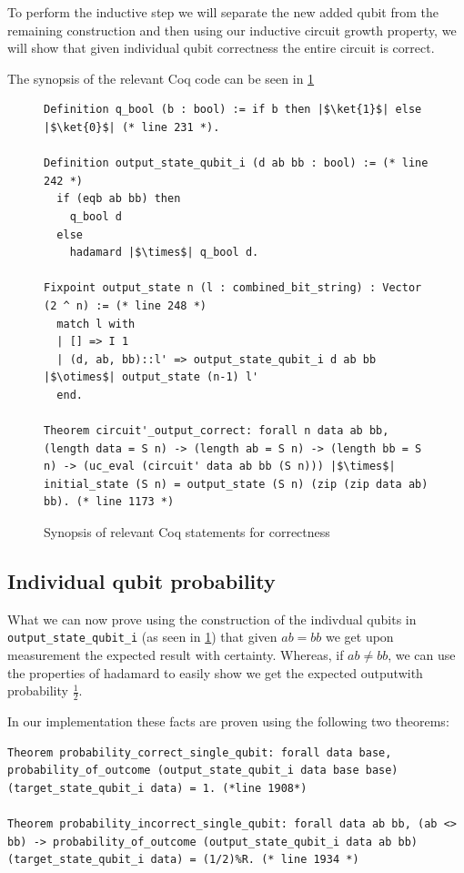 \documentclass{article}
\begin{document}
To perform the inductive step we will separate the new added qubit from the remaining construction and then using our inductive circuit growth property, we will show that given individual qubit correctness the entire circuit is correct.

The synopsis of the relevant Coq code can be seen in \cref{fig:correct-main-circuit}
\begin{figure}[h]
    \centering
\begin{verbatim}
Definition q_bool (b : bool) := if b then |$\ket{1}$| else |$\ket{0}$| (* line 231 *).

Definition output_state_qubit_i (d ab bb : bool) := (* line 242 *)
  if (eqb ab bb) then
    q_bool d
  else
    hadamard |$\times$| q_bool d.

Fixpoint output_state n (l : combined_bit_string) : Vector (2 ^ n) := (* line 248 *)
  match l with
  | [] => I 1
  | (d, ab, bb)::l' => output_state_qubit_i d ab bb |$\otimes$| output_state (n-1) l'
  end.
  
Theorem circuit'_output_correct: forall n data ab bb, (length data = S n) -> (length ab = S n) -> (length bb = S n) -> (uc_eval (circuit' data ab bb (S n))) |$\times$| initial_state (S n) = output_state (S n) (zip (zip data ab) bb). (* line 1173 *)
\end{verbatim}
    \caption{Synopsis of relevant Coq statements for correctness}
    \label{fig:correct-main-circuit}
\end{figure}

\subsection{Individual qubit probability}\label{sec:qubit-prob}

What we can now prove using the construction of the indivdual qubits in \texttt{output\_state\_qubit\_i} (as seen in \cref{fig:correct-main-circuit}) that given $ab=bb$ we get upon measurement the expected result with certainty.
Whereas, if $ab\neq bb$, we can use the properties of hadamard to easily show we get the expected outputwith probability $\frac{1}{2}$.

In our implementation these facts are proven using the following two theorems:
\begin{verbatim}
Theorem probability_correct_single_qubit: forall data base, probability_of_outcome (output_state_qubit_i data base base) (target_state_qubit_i data) = 1. (*line 1908*)

Theorem probability_incorrect_single_qubit: forall data ab bb, (ab <> bb) -> probability_of_outcome (output_state_qubit_i data ab bb) (target_state_qubit_i data) = (1/2)%R. (* line 1934 *)
\end{verbatim}
\end{document}
